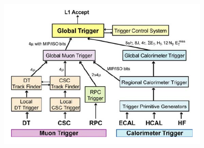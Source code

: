 \vspace{5mm}
\begin{minipage}{0.99\textwidth} 
\begin{center}\label{CMS-SUBD}
\mbox{\includegraphics[height= 0.6\textwidth, width=0.8\textwidth]{THESISPLOTS/Level-1-Trigger-Architecture.png}}
\label{fig:l1trigger}
\end{center}
\end{minipage}

\vspace{5mm}

